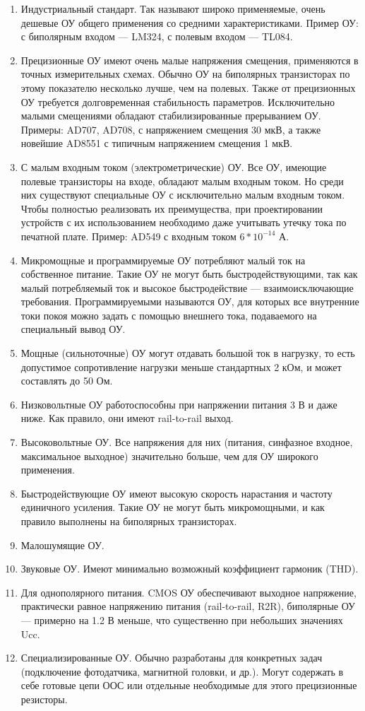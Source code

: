 \begin{enumerate}
\item Индустриальный стандарт. Так называют широко применяемые, очень дешевые ОУ общего применения со средними характеристиками. Пример ОУ: с биполярным входом --- LM324, с полевым входом --- TL084.
\item Прецизионные ОУ имеют очень малые напряжения смещения, применяются в точных измерительных схемах. Обычно ОУ на биполярных транзисторах по этому показателю несколько лучше, чем на полевых. Также от прецизионных ОУ требуется долговременная стабильность параметров. Исключительно малыми смещениями обладают стабилизированные прерыванием ОУ. Примеры: AD707, AD708, с напряжением смещения 30 мкВ, а также новейшие AD8551 с типичным напряжением смещения 1 мкВ.
\item С малым входным током (электрометрические) ОУ. Все ОУ, имеющие полевые транзисторы на входе, обладают малым входным током. Но среди них существуют специальные ОУ с исключительно малым входным током. Чтобы полностью реализовать их преимущества, при проектировании устройств с их использованием необходимо даже учитывать утечку тока по печатной плате. Пример: AD549 с входным током $6 \ast 10^{-14}$ А.
\item Микромощные и программируемые ОУ потребляют малый ток на собственное питание. Такие ОУ не могут быть быстродействующими, так как малый потребляемый ток и высокое быстродействие --- взаимоисключающие требования. Программируемыми называются ОУ, для которых все внутренние токи покоя можно задать с помощью внешнего тока, подаваемого на специальный вывод ОУ.
\item Мощные (сильноточные) ОУ могут отдавать большой ток в нагрузку, то есть допустимое сопротивление нагрузки меньше стандартных 2 кОм, и может составлять до 50 Ом.
\item Низковольтные ОУ работоспособны при напряжении питания 3 В и даже ниже. Как правило, они имеют rail-to-rail выход.
\item Высоковольтные ОУ. Все напряжения для них (питания, синфазное входное, максимальное выходное) значительно больше, чем для ОУ широкого применения.
\item Быстродействующие ОУ имеют высокую скорость нарастания и частоту единичного усиления. Такие ОУ не могут быть микромощными, и как правило выполнены на биполярных транзисторах.
\item Малошумящие ОУ.
\item Звуковые ОУ. Имеют минимально возможный коэффициент гармоник (THD).
\item Для однополярного питания. CMOS ОУ обеспечивают выходное напряжение, практически равное напряжению питания (rail-to-rail, R2R), биполярные ОУ --- примерно на 1.2 В меньше, что существенно при небольших значениях Ucc.
\item Специализированные ОУ. Обычно разработаны для конкретных задач (подключение фотодатчика, магнитной головки, и др.). Могут содержать в себе готовые цепи ООС или отдельные необходимые для этого прецизионные резисторы.
\end{enumerate}


